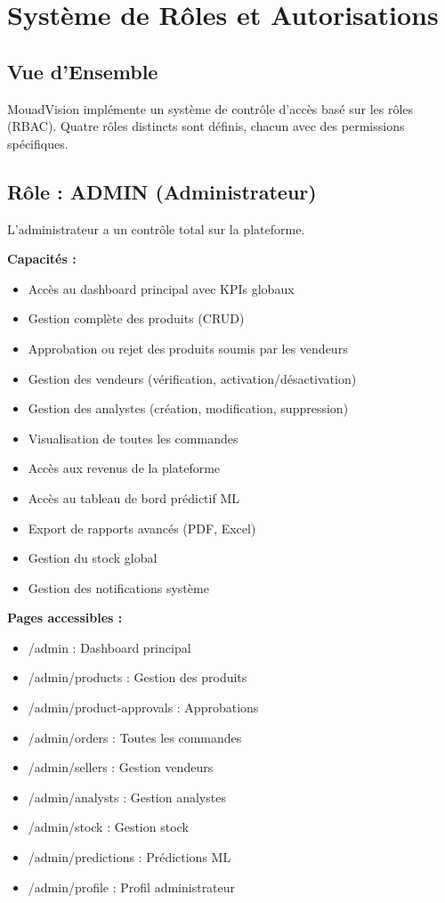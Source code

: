 \documentclass[12pt,a4paper]{report}
\begin{document}
\chapter{Système de Rôles et Autorisations}

\section{Vue d'Ensemble}

MouadVision implémente un système de contrôle d'accès basé sur les rôles (RBAC). Quatre rôles distincts sont définis, chacun avec des permissions spécifiques.

\section{Rôle : ADMIN (Administrateur)}

L'administrateur a un contrôle total sur la plateforme.

\textbf{Capacités :}
\begin{itemize}[noitemsep]
    \item Accès au dashboard principal avec KPIs globaux
    \item Gestion complète des produits (CRUD)
    \item Approbation ou rejet des produits soumis par les vendeurs
    \item Gestion des vendeurs (vérification, activation/désactivation)
    \item Gestion des analystes (création, modification, suppression)
    \item Visualisation de toutes les commandes
    \item Accès aux revenus de la plateforme
    \item Accès au tableau de bord prédictif ML
    \item Export de rapports avancés (PDF, Excel)
    \item Gestion du stock global
    \item Gestion des notifications système
\end{itemize}

\textbf{Pages accessibles :}
\begin{itemize}[noitemsep]
    \item /admin : Dashboard principal
    \item /admin/products : Gestion des produits
    \item /admin/product-approvals : Approbations
    \item /admin/orders : Toutes les commandes
    \item /admin/sellers : Gestion vendeurs
    \item /admin/analysts : Gestion analystes
    \item /admin/stock : Gestion stock
    \item /admin/predictions : Prédictions ML
    \item /admin/profile : Profil administrateur
\end{itemize}
\end{document}
